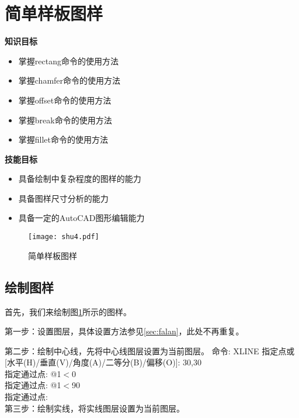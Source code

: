 \section{简单样板图样}\label{sec:yangban}
{\bfseries 知识目标}
\begin{itemize}
\item 掌握rectang命令的使用方法
\item 掌握chamfer命令的使用方法
\item 掌握offset命令的使用方法
\item 掌握break命令的使用方法
\item 掌握fillet命令的使用方法
\end{itemize}
{\bfseries 技能目标}
\begin{itemize}
\item 具备绘制中复杂程度的图样的能力
\item 具备图样尺寸分析的能力
\item 具备一定的AutoCAD图形编辑能力
\end{itemize}
\begin{figure}[htbp]
\centering
\texttt{[image: shu4.pdf]}
\caption{简单样板图样}\label{fig:renwu3}
\end{figure}
\subsection{绘制图样}
首先，我们来绘制图\ref{fig:renwu3}所示的图样。

第一步：设置图层，具体设置方法参见\ref{sec:falan}，此处不再重复。

第二步：绘制中心线，先将中心线图层设置为当前图层。
\noindent
命令: XLINE 指定点或 [水平(H)/垂直(V)/角度(A)/二等分(B)/偏移(O)]: 30,30\\
指定通过点: @1$<$0\\
指定通过点: @1$<$90\\
指定通过点:\\
\indent
第三步：绘制实线，将实线图层设置为当前图层。

